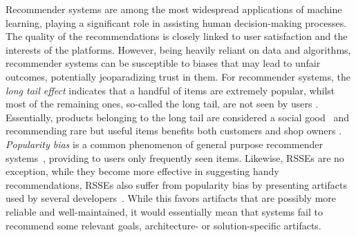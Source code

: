 Recommender systems are among the most widespread applications of machine learning, playing a significant role in assisting human decision-making processes. The quality of the recommendations %
is closely linked to user satisfaction and the interests of the platforms. However, being heavily reliant on data and algorithms, recommender systems can be susceptible to biases that may lead to unfair outcomes, potentially jeoparadizing trust in them. %
For recommender systems, %
the \emph{long tail effect} indicates that a handful of items are extremely popular, whilst most of the remaining ones, so-called the long tail, are not seen by users \cite{Anderson:2006:LTW:1197299}. Essentially, products belonging to the long tail are considered a social good~\cite{DBLP:conf/recsys/AbdollahpouriMB19} and recommending rare but useful items benefits both customers and shop owners \cite{Vargas_sales_diversity_14}. 
\emph{Popularity bias} is a common phenomenon of general purpose recommender systems~\cite{DBLP:conf/flairs/AbdollahpouriBM19,DBLP:conf/recsys/AbdollahpouriMB19,10.1145/3564284}, \ie providing to users only frequently seen items. Likewise, RSSEs are no exception, while they become more effective in suggesting handy recommendations, RSSEs also suffer from popularity bias by presenting artifacts %
used by several developers~\cite{10174041}. While this favors artifacts that are possibly more reliable and well-maintained, it would essentially mean that systems fail to recommend some relevant goals, architecture- or solution-specific artifacts. %



